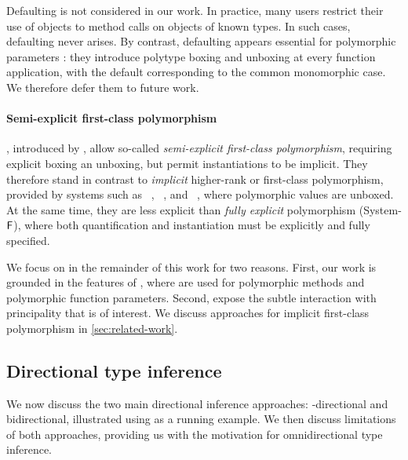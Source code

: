 \documentclass[acmsmall,screen,nonacm%
\Anonymous{,anonymous}{}%
\Final{}{,review}%
]{acmart}
\makeatletter
\newcommand{\BBpolyml}{Garrigue-Remy/poly-ml}
\newcommand{\BBpolyparams}{White/polyparams@ml2023}
\makeatother
\begin{document}

Defaulting is not considered in our work.  In practice, many users restrict
their use of objects to method calls on objects of known types. In such
cases, defaulting never arises.
%
By contrast, defaulting appears essential for polymorphic parameters
\citep*{\BBpolyparams}: they introduce polytype boxing and unboxing at every
function application, with the default corresponding to the common monomorphic
case. We therefore defer them to future work. 

\paragraph{Semi-explicit first-class polymorphism}
\label{sec/overview/polytypes}


\Polytypes, introduced by \citet{\BBpolyml}, allow so-called
\emph{semi-explicit first-class polymorphism}, requiring explicit boxing an
unboxing, but permit instantiations to be implicit. They therefore stand
in contrast to \emph{implicit} higher-rank or first-class polymorphism,
provided by systems such as
\DK~\citep*{dunfield-krishnaswami-bidirectional-poly},
\QuickLook~\citep*{journals/pacmpl/SerranoHJV20}, and \Frost~\citep*{journals/corr/abs-2607-16061},
where polymorphic values are unboxed. At the same time, they are less explicit
than \emph{fully explicit} polymorphism (\eg System-$\mathopen{}\mathrel{\mathsf{F}}$), where both
quantification and instantiation must be explicitly and fully specified.


We focus on \polytypes in the remainder of this work for two reasons. First,
our work is grounded in the features of \OCaml, where \polytypes are used for
polymorphic methods and polymorphic function parameters. Second, \polytypes
expose the subtle interaction with principality that is of interest. We discuss
approaches for implicit first-class polymorphism in \cref{sec:related-work}.

\subsection{Directional type inference}
\label{sec/overview/directional}

We now discuss the two main directional inference approaches:
\geninst-directional and bidirectional, illustrated using \polytypes as a
running example. We then discuss limitations of both approaches, providing us
with the motivation for omnidirectional type inference.
\end{document}
